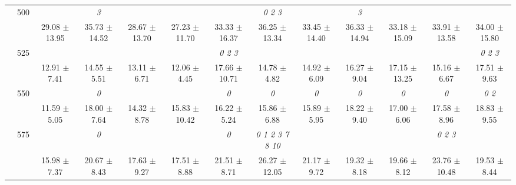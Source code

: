 \begin{table}[h]
{\begin{tabular}{
        ccccccccccccc}
 & \multirow{2}{*}{500}& & \textit{ 3 }& & & & \textit{ 0 2 3 }& & \textit{ 3 }& & &  \\ 
 & & 29.08 $\pm$ 13.95& 35.73 $\pm$ 14.52& 28.67 $\pm$ 13.70& 27.23 $\pm$ 11.70& 33.33 $\pm$ 16.37& 36.25 $\pm$ 13.34& 33.45 $\pm$ 14.40& 36.33 $\pm$ 14.94& 33.18 $\pm$ 15.09& 33.91 $\pm$ 13.58& 34.00 $\pm$ 15.80 \\ 
 & \multirow{2}{*}{525}& \cellcolor[HTML]{EFEFEF} & \cellcolor[HTML]{EFEFEF} & \cellcolor[HTML]{EFEFEF} & \cellcolor[HTML]{EFEFEF} & \cellcolor[HTML]{EFEFEF} \textit{ 0 2 3 }& \cellcolor[HTML]{EFEFEF} & \cellcolor[HTML]{EFEFEF} & \cellcolor[HTML]{EFEFEF} & \cellcolor[HTML]{EFEFEF} & \cellcolor[HTML]{EFEFEF} & \cellcolor[HTML]{EFEFEF} \textit{ 0 2 3 } \\ 
 & & \cellcolor[HTML]{EFEFEF} 12.91 $\pm$ 7.41& \cellcolor[HTML]{EFEFEF} 14.55 $\pm$ 5.51& \cellcolor[HTML]{EFEFEF} 13.11 $\pm$ 6.71& \cellcolor[HTML]{EFEFEF} 12.06 $\pm$ 4.45& \cellcolor[HTML]{EFEFEF} 17.66 $\pm$ 10.71& \cellcolor[HTML]{EFEFEF} 14.78 $\pm$ 4.82& \cellcolor[HTML]{EFEFEF} 14.92 $\pm$ 6.09& \cellcolor[HTML]{EFEFEF} 16.27 $\pm$ 9.04& \cellcolor[HTML]{EFEFEF} 17.15 $\pm$ 13.25& \cellcolor[HTML]{EFEFEF} 15.16 $\pm$ 6.67& \cellcolor[HTML]{EFEFEF} 17.51 $\pm$ 9.63 \\ 
 & \multirow{2}{*}{550}& & \textit{ 0 }& & & \textit{ 0 }& \textit{ 0 }& \textit{ 0 }& \textit{ 0 }& \textit{ 0 }& \textit{ 0 }& \textit{ 0 2 } \\ 
 & & 11.59 $\pm$ 5.05& 18.00 $\pm$ 7.64& 14.32 $\pm$ 8.78& 15.83 $\pm$ 10.42& 16.22 $\pm$ 5.24& 15.86 $\pm$ 6.88& 15.89 $\pm$ 5.95& 18.22 $\pm$ 9.40& 17.00 $\pm$ 6.06& 17.58 $\pm$ 8.96& 18.83 $\pm$ 9.55 \\ 
 & \multirow{2}{*}{575}& \cellcolor[HTML]{EFEFEF} & \cellcolor[HTML]{EFEFEF} \textit{ 0 }& \cellcolor[HTML]{EFEFEF} & \cellcolor[HTML]{EFEFEF} & \cellcolor[HTML]{EFEFEF} \textit{ 0 }& \cellcolor[HTML]{EFEFEF} \textit{  0  1  2  3  7  8 10 }& \cellcolor[HTML]{EFEFEF} & \cellcolor[HTML]{EFEFEF} & \cellcolor[HTML]{EFEFEF} & \cellcolor[HTML]{EFEFEF} \textit{ 0 2 3 }& \cellcolor[HTML]{EFEFEF}  \\ 
 & & \cellcolor[HTML]{EFEFEF} 15.98 $\pm$ 7.37& \cellcolor[HTML]{EFEFEF} 20.67 $\pm$ 8.43& \cellcolor[HTML]{EFEFEF} 17.63 $\pm$ 9.27& \cellcolor[HTML]{EFEFEF} 17.51 $\pm$ 8.88& \cellcolor[HTML]{EFEFEF} 21.51 $\pm$ 8.71& \cellcolor[HTML]{EFEFEF} 26.27 $\pm$ 12.05& \cellcolor[HTML]{EFEFEF} 21.17 $\pm$ 9.72& \cellcolor[HTML]{EFEFEF} 19.32 $\pm$ 8.18& \cellcolor[HTML]{EFEFEF} 19.66 $\pm$ 8.12& \cellcolor[HTML]{EFEFEF} 23.76 $\pm$ 10.48& \cellcolor[HTML]{EFEFEF} 19.53 $\pm$ 8.44 \\ 

\end{tabular}}
\end{table}
